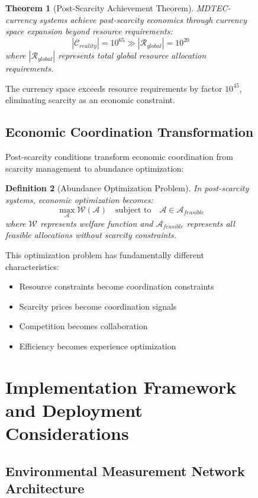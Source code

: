 \documentclass[12pt,a4paper]{article}
\newtheorem{theorem}{Theorem}
\newtheorem{definition}[theorem]{Definition}
\begin{document}
\begin{figure}[H]
\begin{theorem}[Post-Scarcity Achievement Theorem]
MDTEC-currency systems achieve post-scarcity economics through currency space expansion beyond resource requirements:
\begin{equation}
|\mathcal{C}_{reality}| = 10^{65} \gg |\mathcal{R}_{global}| = 10^{20}
\end{equation}
where $|\mathcal{R}_{global}|$ represents total global resource allocation requirements.
\end{theorem}

The currency space exceeds resource requirements by factor $10^{45}$, eliminating scarcity as an economic constraint.

\subsection{Economic Coordination Transformation}

Post-scarcity conditions transform economic coordination from scarcity management to abundance optimization:

\begin{definition}[Abundance Optimization Problem]
In post-scarcity systems, economic optimization becomes:
\begin{equation}
\max_{\mathcal{A}} \mathcal{W}(\mathcal{A}) \quad \text{subject to} \quad \mathcal{A} \in \mathcal{A}_{feasible}
\end{equation}
where $\mathcal{W}$ represents welfare function and $\mathcal{A}_{feasible}$ represents all feasible allocations without scarcity constraints.
\end{definition}

This optimization problem has fundamentally different characteristics:
\begin{itemize}
\item Resource constraints become coordination constraints
\item Scarcity prices become coordination signals  
\item Competition becomes collaboration
\item Efficiency becomes experience optimization
\end{itemize}

\section{Implementation Framework and Deployment Considerations}

\subsection{Environmental Measurement Network Architecture}


\end{figure}
\end{document}
